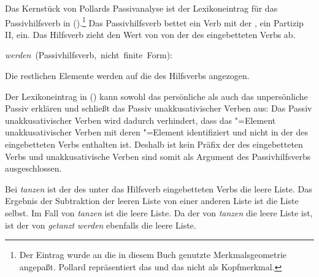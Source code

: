 {Das Kernstück von Pollards Passivanalyse ist der Lexikoneintrag für das Passivhilfsverb in ().\footnote{
        Der Eintrag wurde an die in diesem Buch genutzte Merkmalsgeometrie angepaßt.
        Pollard repräsentiert das \ergm und das \subjm nicht als Kopfmerkmal.%
}
Das Passivhilfsverb bettet ein Verb mit der \vform{} , \dash ein Partizip II, ein.
Das Hilfsverb zieht den Wert von \HPSGerg {} von der \compsl des eingebetteten Verbs ab.

\eas
\label{le-passiv-prelim-Pollard}
\mbox{\emph{werden} (Passivhilfsverb, nicht finite Form):} \\
\zs

\noindent
Die restlichen Elemente  werden auf die \compsl des Hilfsverbs angezogen.

Der Lexikoneintrag in () kann sowohl das persönliche als auch das unpersönliche
Passiv erklären und schließt das Passiv unakkusativischer Verben aus:
Das Passiv unakkusativischer Verben wird dadurch verhindert, dass das \HPSGerg"=Element
unakkusativischer Verben mit deren \subj"=Element identifiziert und nicht in der
\compsl des eingebetteten Verbs enthalten ist. Deshalb ist \HPSGerg kein Präfix
der \compsl des eingebetteten Verbs und unakkusativische Verben sind somit als
Argument des Passivhilfsverbs ausgeschlossen.

Bei \emph{tanzen} ist der \ergw des unter das Hilfsverb eingebetteten Verbs
die leere Liste. Das Ergebnis der Subtraktion der leeren Liste von einer anderen
Liste ist die Liste selbst. Im Fall von {\em tanzen} ist  die leere Liste.
Da der \ergw von \emph{tanzen} die leere Liste ist, ist der \subjw 
von \emph{getanzt werden} ebenfalls die leere Liste.

}
